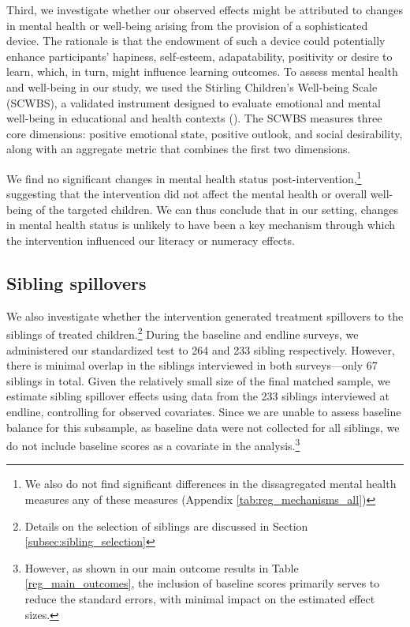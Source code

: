\documentclass[hidelinks,12pt]{article}
\begin{document}
\begin{singlespace}
Third, we investigate whether our observed effects might be attributed to changes in mental health or well-being arising from the provision of a sophisticated device. The rationale is that the endowment of such a device could potentially enhance participants’ hapiness, self-esteem, adapatability, positivity or desire to learn, which, in turn, might influence learning outcomes. To assess mental health and well-being in our study, we used the Stirling Children's Well-being Scale (SCWBS), a validated instrument designed to evaluate emotional and mental well-being in educational and health contexts (\cite{liddle_emotional_2015}). The SCWBS measures three core dimensions: positive emotional state, positive outlook, and social desirability, along with an aggregate metric that combines the first two dimensions.

We find no significant changes in mental health status post-intervention,\footnote{We also do not find significant differences in the dissagregated mental health measures any of these measures (Appendix \ref{tab:reg_mechanisms_all})} suggesting that the intervention did not affect the mental health or overall well-being of the targeted children. We can thus conclude that in our setting, changes in mental health status is unlikely to have been a key mechanism through which the intervention influenced our literacy or numeracy effects.


\subsection{Sibling spillovers} %
We also investigate whether the intervention generated treatment spillovers to the siblings of treated children.\footnote{Details on the selection of siblings are discussed in Section \ref{subsec:sibling_selection}} During the baseline and endline surveys, we administered our standardized test to 264 and 233 sibling respectively. However, there is minimal overlap in the siblings interviewed in both surveys—only 67 siblings in total. Given the relatively small size of the final matched sample, we estimate sibling spillover effects using data from the 233 siblings interviewed at endline, controlling for observed covariates. Since we are unable to assess baseline balance for this subsample, as baseline data were not collected for all siblings, we do not include baseline scores as a covariate in the analysis.\footnote{However, as shown in our main outcome results in Table \ref{reg_main_outcomes}, the inclusion of baseline scores primarily serves to reduce the standard errors, with minimal impact on the estimated effect sizes.}


\end{singlespace}
\end{document}
